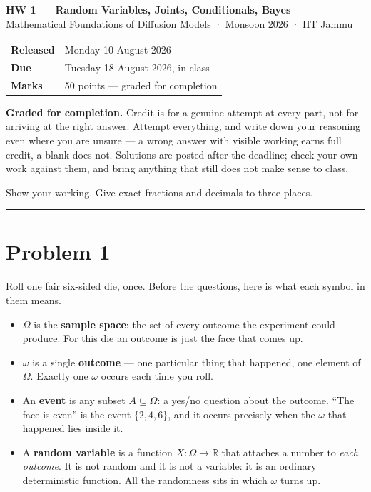 \documentclass[11pt,a4paper]{article}
\begin{document}
\begin{center}
  {\Large\bfseries HW 1 — Random Variables, Joints, Conditionals, Bayes}\\[0.4em]
  {\small Mathematical Foundations of Diffusion Models · Monsoon 2026 · IIT Jammu}
\end{center}

\medskip
\begin{center}
\begin{tabular}{@{}ll@{}}
\toprule
\textbf{Released} & Monday 10 August 2026 \\
\textbf{Due}      & Tuesday 18 August 2026, in class \\
\textbf{Marks}    & 50 points --- graded for completion \\
\bottomrule
\end{tabular}
\end{center}

\medskip
\noindent
\textbf{Graded for completion.} Credit is for a genuine attempt at every part, not
for arriving at the right answer. Attempt everything, and write down your
reasoning even where you are unsure — a wrong answer with visible working earns
full credit, a blank does not. Solutions are posted after the deadline; check your
own work against them, and bring anything that still does not make sense to class.

\medskip
\noindent
Show your working. Give exact fractions and decimals to three places.

\bigskip
\hrule
\bigskip

\section*{Problem 1}

Roll one fair six-sided die, once. Before the questions, here is what each symbol
in them means.

\begin{itemize}\setlength{\itemsep}{0.4em}
  \item $\Omega$ is the \textbf{sample space}: the set of every outcome the
        experiment could produce. For this die an outcome is just the face that
        comes up.
  \item $\omega$ is a single \textbf{outcome} — one particular thing that
        happened, one element of $\Omega$. Exactly one $\omega$ occurs each time
        you roll.
  \item An \textbf{event} is any subset $A \subseteq \Omega$: a yes/no question
        about the outcome. ``The face is even'' is the event $\{2,4,6\}$, and it
        occurs precisely when the $\omega$ that happened lies inside it.
  \item A \textbf{random variable} is a function $X : \Omega \to \mathbb{R}$ that
        attaches a number to \emph{each outcome}. It is not random and it is not a
        variable: it is an ordinary deterministic function. All the randomness sits
        in which $\omega$ turns up.
\end{itemize}
\end{document}
